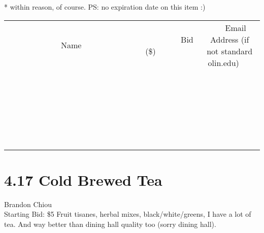 \documentclass[11pt]{article}
\begin{document}
* within reason, of course. 
PS: no expiration date on this item :)
\\[6ex]
\begin{tabular}{c c c}
~~~~~~~~~~~~~Name~~~~~~~~~~~~~ & ~~~~~~~~~Bid (\$)~~~~~~~~~  & ~~~Email Address (if not standard olin.edu)~~~\\
 & & \\
\hline
 & & \\
\hline
 & & \\
\hline
 & & \\
\hline
 & & \\
\hline
 & & \\
\hline
 & & \\
\hline
 & & \\
\hline
 & & \\
\hline
 & & \\
\hline
 & & \\
\hline
 & & \\
\hline
 & & \\
\hline
 & & \\
\hline
 & & \\
\hline
 & & \\
\hline
 & & \\
\hline
 & & \\
\hline
 & & \\
\hline
 & & \\
\hline
 & & \\
\hline
 & & \\
\hline
 & & \\
\hline
 & & \\
\hline
 & & \\
\hline
 & & \\
\hline
\end{tabular}
\newpage
\section*{4.17 Cold Brewed Tea}
Brandon Chiou
\\
Starting Bid: \$5
\newline
Fruit tisanes, herbal mixes, black/white/greens, I have a lot of tea. And way better than dining hall quality too (sorry dining hall).
\end{document}
